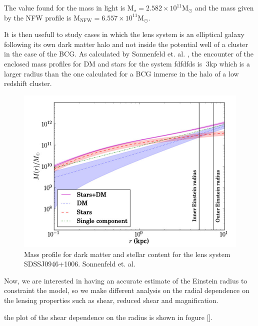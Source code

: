 The value found for the mass in light is $\text{M}_{\star}=2.582\times 10^{11}\text{M}_{\odot}$ and the mass given by the NFW profile is $\text{M}_{\text{NFW}}=6.557\times 10^{11}\text{M}_{\odot}$.

It is then usefull to study cases in which the lens system is an elliptical galaxy following its own dark matter halo and not inside the potential well of a cluster in the case of the BCG. As calculated by Sonnenfeld et. al. \citeyear{Reference15}, the encounter of the enclosed mass profiles for DM and stars for the system fdfdfds is $~3\text{kp}$ which is a larger radius than the one calculated for a BCG inmerse in the halo of a low redshift cluster.  

\begin{figure}[H]
\centering
\includegraphics[width=12cm]{images/sonnenfeld_galaxy.png}
\caption[DM and Stellar mass profiles for a massive early type galaxy.]{Mass profile for dark matter and stellar content for the lens system SDSSJ0946+1006. Sonnenfeld et. al. \citeyear{Reference15}}
\end{figure}

Now, we are interested in having an accurate estimate of the Einstein radius to constraint the model, so we make different analysis on the radial dependence on the lensing properties such as shear, reduced shear and magnification.

the plot of the shear dependence on the radius is shown in fogure [].

